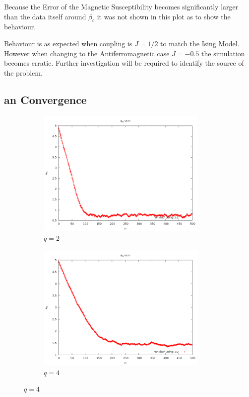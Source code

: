 \documentclass[12pt,a4paper,notitlepage,twoside]{article}
\begin{document}
Because the Error of the Magnetic Susceptibility becomes significantly larger than the data itself around $\beta_c$ it was not shown in this plot as to show the behaviour.

Behaviour is as expected when coupling is $J = 1/2$ to match the Ising Model. However when changing to the Antiferromagnetic case $J=-0.5$ the simulation becomes erratic.
Further investigation will be required to identify the source of the problem.

\subsection{an Convergence}

\begin{figure}[H]
\centering
\begin{subfigure}[b]{0.45\textwidth}
	\includegraphics[width=0.9\textwidth]{q2d20/anconvergence.png}
	\caption{$q=2$}
\end{subfigure}
\begin{subfigure}[b]{0.45\textwidth}
	\includegraphics[width=0.9\textwidth]{q4d20/anconvergence.png}
	\caption{$q=4$}
\end{subfigure}


\end{figure}
\end{document}
